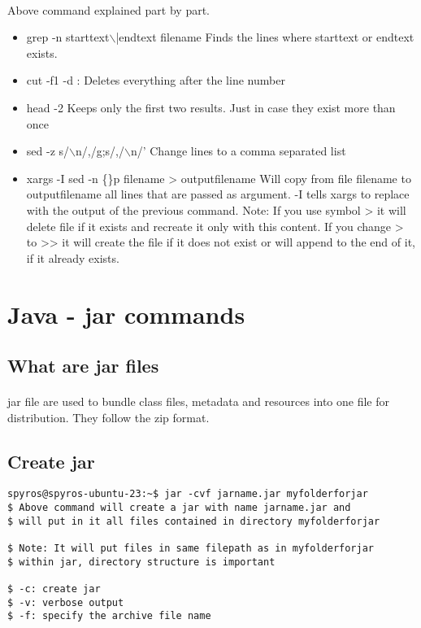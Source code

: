 \documentclass{article}
\begin{document}
\paragraph{} Above command explained part by part.
\begin{itemize}
	\item grep -n \textquotedbl starttext$\backslash$|endtext\textquotedbl{} filename
		\subitem Finds the lines where starttext or endtext exists.
	\item cut -f1 -d :
		\subitem Deletes everything after the line number
	\item head -2
		\subitem Keeps only the first two results. Just in case they exist more than once
	\item sed -z \textquotesingle s/$\backslash$n/,/g;s/,\textdollar/$\backslash$n/'
		\subitem Change lines to a comma separated list
	\item xargs -I {} sed -n \textquotesingle \{\}p\textquotesingle{} filename > outputfilename
		\subitem Will copy from file filename to outputfilename all lines that are passed as argument. -I {} tells xargs to replace {} with the output of the previous command.
		\subitem Note: If you use symbol > it will delete file if it exists and recreate it only with this content. If you change > to >{}> it will create the file if it does not exist or will append to the end of it, if it already exists.
\end{itemize}


\section{Java - jar commands}

\subsection{What are jar files}
\paragraph{} jar file are used to bundle class files, metadata and resources into one file for distribution. They follow the zip format.

\subsection{Create jar}
\begin{lstlisting}
spyros@spyros-ubuntu-23:~$ jar -cvf jarname.jar myfolderforjar
$ Above command will create a jar with name jarname.jar and
$ will put in it all files contained in directory myfolderforjar

$ Note: It will put files in same filepath as in myfolderforjar
$ within jar, directory structure is important

$ -c: create jar
$ -v: verbose output
$ -f: specify the archive file name

\end{lstlisting}
\end{document}
